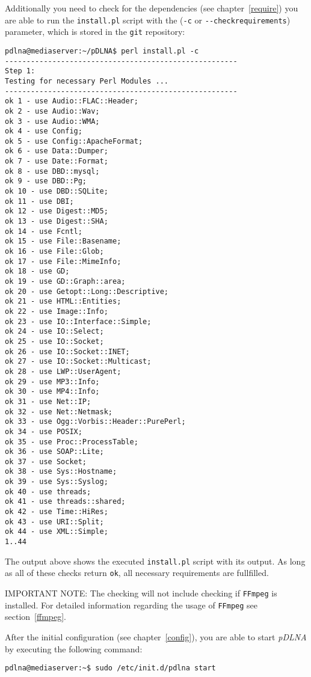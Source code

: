 Additionally you need to check for the dependencies (see chapter~\ref{require}) you are able to run the \verb|install.pl| script with the (\verb|-c| or \verb|--checkrequirements|) parameter, which is stored in the \verb|git| repository:
\begin{lstlisting}
pdlna@mediaserver:~/pDLNA$ perl install.pl -c
------------------------------------------------------
Step 1:
Testing for necessary Perl Modules ...
------------------------------------------------------
ok 1 - use Audio::FLAC::Header;
ok 2 - use Audio::Wav;
ok 3 - use Audio::WMA;
ok 4 - use Config;
ok 5 - use Config::ApacheFormat;
ok 6 - use Data::Dumper;
ok 7 - use Date::Format;
ok 8 - use DBD::mysql;
ok 9 - use DBD::Pg;
ok 10 - use DBD::SQLite;
ok 11 - use DBI;
ok 12 - use Digest::MD5;
ok 13 - use Digest::SHA;
ok 14 - use Fcntl;
ok 15 - use File::Basename;
ok 16 - use File::Glob;
ok 17 - use File::MimeInfo;
ok 18 - use GD;
ok 19 - use GD::Graph::area;
ok 20 - use Getopt::Long::Descriptive;
ok 21 - use HTML::Entities;
ok 22 - use Image::Info;
ok 23 - use IO::Interface::Simple;
ok 24 - use IO::Select;
ok 25 - use IO::Socket;
ok 26 - use IO::Socket::INET;
ok 27 - use IO::Socket::Multicast;
ok 28 - use LWP::UserAgent;
ok 29 - use MP3::Info;
ok 30 - use MP4::Info;
ok 31 - use Net::IP;
ok 32 - use Net::Netmask;
ok 33 - use Ogg::Vorbis::Header::PurePerl;
ok 34 - use POSIX;
ok 35 - use Proc::ProcessTable;
ok 36 - use SOAP::Lite;
ok 37 - use Socket;
ok 38 - use Sys::Hostname;
ok 39 - use Sys::Syslog;
ok 40 - use threads;
ok 41 - use threads::shared;
ok 42 - use Time::HiRes;
ok 43 - use URI::Split;
ok 44 - use XML::Simple;
1..44
\end{lstlisting}
The output above shows the executed \verb|install.pl| script with its output. As long as all of these checks return \verb|ok|, all necessary requirements are fullfilled.

\begin{colframeimportantnote}
\textsc{IMPORTANT NOTE:} The checking will not include checking if \verb|FFmpeg| is installed. For detailed information regarding the usage of \verb|FFmpeg| see section~\ref{ffmpeg}.
\end{colframeimportantnote}

After the initial configuration (see chapter~\ref{config}), you are able to start {\em pDLNA} by executing the following command:
\begin{lstlisting}
pdlna@mediaserver:~$ sudo /etc/init.d/pdlna start
\end{lstlisting}

